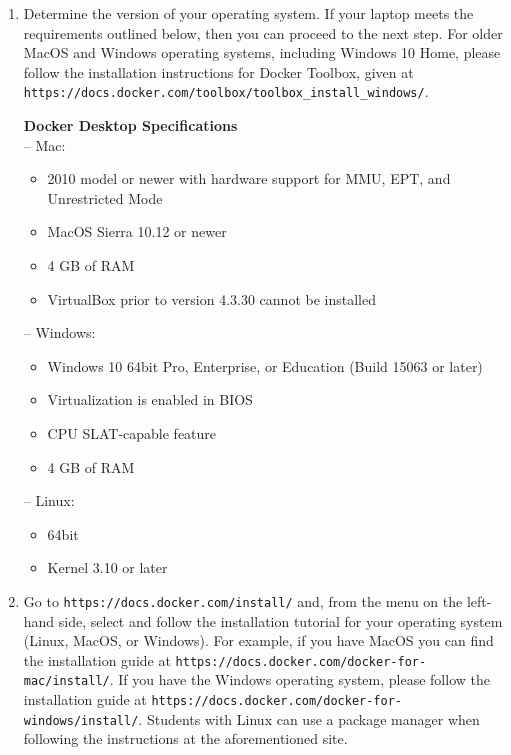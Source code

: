 \documentclass[11pt]{article}
\newcommand{\url}[1]{\lstinline{#1}}
\begin{document}
\begin{enumerate}

    \item Determine the version of your operating system. If your laptop meets
      the requirements outlined below, then you can proceed to the next step.
      For older MacOS and Windows operating systems, including Windows 10 Home,
      please follow the installation instructions for Docker Toolbox, given at
      \url{https://docs.docker.com/toolbox/toolbox_install_windows/}.

      \textbf{Docker Desktop Specifications} \\
      -- Mac:
      \begin{itemize}
        \item 2010 model or newer with hardware support for MMU, EPT, and Unrestricted Mode
        \item MacOS Sierra 10.12 or newer
        \item 4 GB of RAM
        \item VirtualBox prior to version 4.3.30 cannot be installed
      \end{itemize}
      -- Windows:
      \begin{itemize}
        \item Windows 10 64bit Pro, Enterprise, or Education (Build 15063 or later)
        \item Virtualization is enabled in BIOS
        \item CPU SLAT-capable feature
        \item 4 GB of RAM
      \end{itemize}
      -- Linux:
      \begin{itemize}
        \item 64bit
        \item Kernel 3.10 or later
      \end{itemize}

    \item Go to \url{https://docs.docker.com/install/} and, from the menu on
      the left-hand side, select and follow the installation tutorial for your
      operating system (Linux, MacOS, or Windows). For example, if you have
      MacOS you can find the installation guide at
      \url{https://docs.docker.com/docker-for-mac/install/}. If you have the
      Windows operating system, please follow the installation guide at
      \url{https://docs.docker.com/docker-for-windows/install/}. Students with
      Linux can use a package manager when following the instructions at the
      aforementioned site.


\end{enumerate}
\end{document}
